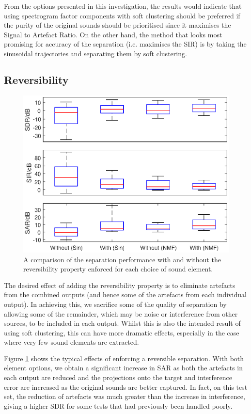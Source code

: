 \documentclass[12pt,a4paper,twoside,openright]{report}
\begin{document}
From the options presented in this investigation, the results would indicate that using spectrogram factor components with soft clustering should be preferred if the purity of the original sounds should be prioritised since it maximises the Signal to Artefact Ratio. On the other hand, the method that looks most promising for accuracy of the separation (i.e. maximises the SIR) is by taking the sinusoidal trajectories and separating them by soft clustering.

\subsection{Reversibility}


\begin{figure}
\centering
\includegraphics[width=0.7\linewidth]{./ReversibleCompBoxPlots}
\caption{A comparison of the separation performance with and without the reversibility property enforced for each choice of sound element.}
\label{fig:ReversibleCompBoxPlots}
\end{figure}

The desired effect of adding the reversibility property is to eliminate artefacts from the combined outputs (and hence some of the artefacts from each individual output). In achieving this, we sacrifice some of the quality of separation by allowing some of the remainder, which may be noise or interference from other sources, to be included in each output. Whilst this is also the intended result of using soft clustering, this can have more dramatic effects, especially in the case where very few sound elements are extracted.

Figure \ref{fig:ReversibleCompBoxPlots} shows the typical effects of enforcing a reversible separation. With both element options, we obtain a significant increase in SAR as both the artefacts in each output are reduced and the projections onto the target and interference error are increased as the original sounds are better captured. In fact, on this test set, the reduction of artefacts was much greater than the increase in interference, giving a higher SDR for some tests that had previously been handled poorly.
\end{document}
